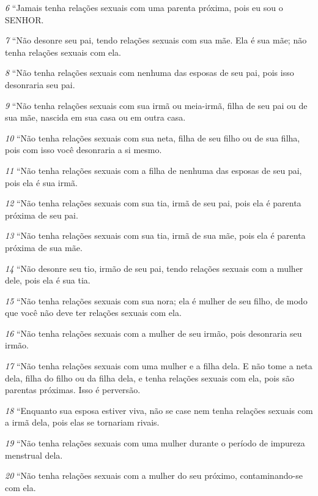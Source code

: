 \smallskip
\textit{\tiny 6} 
“Jamais tenha relações sexuais com uma parenta próxima, pois eu sou o
SENHOR. 

\smallskip
\textit{\tiny 7} 
“Não desonre seu pai, tendo relações sexuais com sua mãe. Ela é sua mãe; não
tenha relações sexuais com ela. 

\smallskip
\textit{\tiny 8} 
“Não tenha relações sexuais com nenhuma das esposas de seu pai, pois isso
desonraria seu pai. 

\smallskip
\textit{\tiny 9} 
“Não tenha relações sexuais com sua irmã ou meia-irmã, filha de seu pai ou de
sua mãe, nascida em sua casa ou em outra casa.

\smallskip
\textit{\tiny 10}
“Não tenha relações sexuais com sua neta, filha de seu filho ou de sua filha,
pois com isso você desonraria a si mesmo.

\smallskip
\textit{\tiny 11}
“Não tenha relações sexuais com a filha de nenhuma das esposas de seu pai,
pois ela é sua irmã.

\smallskip
\textit{\tiny 12}
“Não   tenha relações sexuais com sua tia, irmã de seu pai, pois ela é parenta
próxima de seu pai.

\smallskip
\textit{\tiny 13}
“Não tenha relações sexuais com sua tia, irmã de sua mãe, pois ela é parenta
próxima de sua mãe.

\smallskip
\textit{\tiny 14}
“Não desonre seu tio, irmão de seu pai, tendo relações sexuais com a mulher
dele, pois ela é sua tia.
   
\smallskip
\textit{\tiny 15}
“Não tenha relações sexuais com sua nora; ela é mulher de seu filho, de modo
que você não deve ter relações sexuais com ela.

\smallskip
\textit{\tiny 16}
“Não tenha relações sexuais com a mulher de seu irmão, pois desonraria seu
irmão.
   
\smallskip
\textit{\tiny 17}
“Não tenha relações sexuais com uma mulher e a filha dela. E não tome
 a
neta dela, filha do filho ou da filha dela, e tenha relações sexuais com ela, pois são
parentas próximas. Isso é perversão.

\smallskip
\textit{\tiny 18}
“Enquanto sua esposa estiver viva, não se case nem tenha relações sexuais
com a irmã dela, pois elas se tornariam rivais.
   
\smallskip
\textit{\tiny 19}
“Não tenha relações sexuais com uma mulher durante o período de impureza
menstrual dela.
   
\smallskip
\textit{\tiny 20}
“Não tenha relações sexuais com a mulher do seu próximo, contaminando-se
com ela.
   

